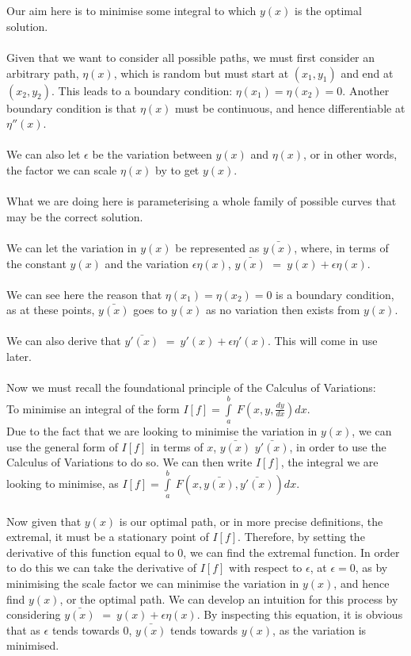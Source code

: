 \documentclass[12pt]{report}
\begin{document}
\\
\\
Our aim here is to minimise some integral to which \(y(x)\) is the optimal solution.
\\
\\
Given that we want to consider all possible paths, we must first consider an arbitrary path, \(\eta (x)\), which is random but must start at \((x_{1}, y_{1})\) and end at \((x_{2}, y_{2})\). This leads to a boundary condition: \(\eta (x_{1}) = \eta (x_{2}) = 0\). Another boundary condition is that \(\eta (x)\) must be continuous, and hence differentiable at \(\eta '' (x)\).
\\
\\
We can also let \(\epsilon\) be the variation between \(y(x)\) and \(\eta (x)\), or in other words, the factor we can scale \(\eta (x)\) by to get \(y(x)\).
\\
\\
What we are doing here is parameterising a whole family of possible curves that may be the correct solution.
\\
\\
We can let the variation in \(y(x)\) be represented as $\bar{y(x)}$, where, in terms of the constant \(y(x)\) and the variation \(\epsilon\eta (x)\),  $\bar{y(x)}$ \( =\ y(x)+\epsilon\eta (x)\).
\\
\\
We can see here the reason that \(\eta (x_{1}) = \eta (x_{2}) = 0\) is a boundary condition, as at these points, $\bar{y(x)}$ goes to \(y(x)\) as no variation then exists from \(y(x)\).
\\\\
We can also derive that $\bar{y'(x)}$ \( =\ y'(x)+\epsilon\eta' (x)\). This will come in use later.
\\
\\
Now we must recall the foundational principle of the Calculus of Variations:
\\
To minimise an integral of the form \(I[f] = \int\limits_a^b\ F(x, y, \frac{dy}{dx}) dx\).
\\
Due to the fact that we are looking to minimise the variation in \(y(x)\), we can use the general form of \(I[f]\) in terms of \(x\), $\bar{y(x)}$ $\bar{y'(x)}$, in order to use the Calculus of Variations to do so. We can then write \(I[f]\), the integral we are looking to minimise, as \(I[f] = \int\limits_a^b\ F(x, \bar{y(x)}, \bar{y'(x)})dx\).
\\
\\
Now given that \(y(x)\) is our optimal path, or in more precise definitions, the extremal, it must be a stationary point of \(I[f]\). Therefore, by setting the derivative of this function equal to \(0\), we can find the extremal function. In order to do this we can take the derivative of \(I[f]\) with respect to \(\epsilon\), at \(\epsilon = 0\), as by minimising the scale factor we can minimise the variation in \(y(x)\), and hence find \(y(x)\), or the optimal path. We can develop an intuition for this process by considering $\bar{y(x)}$ \( =\ y(x)+\epsilon\eta (x)\). By inspecting this equation, it is obvious that as \(\epsilon\) tends towards 0, $\bar{y(x)}$ tends towards \(y(x)\), as the variation is minimised.
\end{document}
